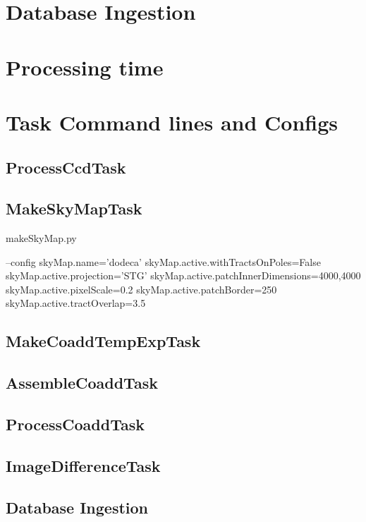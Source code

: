 \documentclass[12pt]{article}
\begin{document}

\clearpage 
\section{Database Ingestion} 


\clearpage 
\section{Processing time} 


\clearpage 
\appendix
\section{Task Command lines and Configs}

\subsection{ProcessCcdTask}

\subsection{MakeSkyMapTask}
\begin{python}
makeSkyMap.py

--config
skyMap.name='dodeca'
skyMap.active.withTractsOnPoles=False
skyMap.active.projection='STG'
skyMap.active.patchInnerDimensions=4000,4000
skyMap.active.pixelScale=0.2
skyMap.active.patchBorder=250
skyMap.active.tractOverlap=3.5
\end{python}

\subsection{MakeCoaddTempExpTask} 

\subsection{AssembleCoaddTask} 

\subsection{ProcessCoaddTask} 

\subsection{ImageDifferenceTask} 

\subsection{Database Ingestion} 

\end{document}
